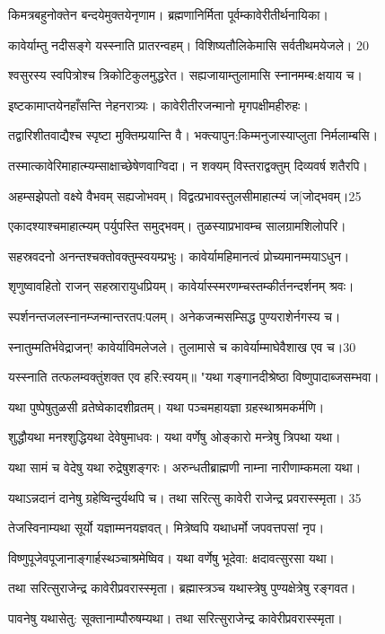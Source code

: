 किमत्रबहुनोक्तेन बन्दयेमुक्तयेनृणाम।
ब्रह्मणानिर्मिता पूर्वम्कावेरीतीर्थनायिका।

कावेर्याम्तु नदीसङ्गे यस्स्नाति प्रातरन्वहम्।
विशिष्यतौलिकेमासि सर्वतीथमयेजले। 20

श्वसुरस्य स्वपित्रोश्च त्रिकोटिकुलमुद्धरेत।
सह्यजायाम्तुलामासि स्नानमम्ब:क्षयाय च।

इष्टकामाप्तयेनहाँसन्ति नेहनरात्र्यः।
कावेरीतीरजन्मानो मृगपक्षीमहीरुहः।

तद्वारिशीतवाद्यैश्च स्पृष्टा मुक्तिम्प्रयान्ति वै।
भक्त्यापुन:किम्मनुजास्याप्लुता निर्मलाम्बसि।

तस्मात्कावेरिमाहात्म्यम्साक्षाच्छेषेणवाग्विदा।
न शक्यम् विस्तराद्वक्तुम् दिव्यवर्ष शतैरपि।

अहम्सझेपतो वक्ष्ये वैभवम् सह्यजोभवम्।
विद्वत्प्रभावस्तुलसीमाहात्म्यं ज[जोद्भवम्।25

एकादश्याश्चमाहात्म्यम् पर्युपस्ति समुद्भवम्।
तुळस्याप्रभावम्च सालग्रामशिलोपरि।

सहस्रवदनो अनन्तश्चक्तोवक्तुम्स्वयम्प्रभुः।
कावेर्यामहिमानत्वं प्रोच्यमानम्मयाऽधुन।

शृणुष्वावहितो राजन् सहस्रारायुधप्रियम्।
कावेर्यास्स्मरणम्चस्तम्कीर्तनन्दर्शनम् श्रवः।

स्पर्शनन्तजलस्नानम्जन्मान्तरतप:पलम्।
अनेकजन्मसम्सिद्ध पुण्यराशेर्नगस्य च।

स्नातुम्मतिर्भवेद्राजन्! कावेर्याविमलेजले।
तुलामासे च कावेर्याम्माघेवैशाख एव च।30

यस्स्नाति तत्फलम्वक्तुंशक्त एव हरि:स्वयम्॥
"यथा गङ्गानदीश्रेष्ठा विष्णुपादाब्जसम्भवा।

यथा पुष्पेषुतुळसी व्रतेष्वेकादशीव्रतम्।
यथा पञ्चमहायज्ञा ग्रहस्थाश्रमकर्मणि।

शुद्धौयथा मनश्शुद्धियथा देवेषुमाधवः।
यथा वर्णेषु ओङ्कारो मन्त्रेषु त्रिपथा यथा।

यथा सामं च वेदेषु यथा रुद्रेषुशङ्गरः।
अरुन्धतीब्राह्मणी नाम्ना नारीणाम्कमला यथा।

यथाऽन्नदानं दानेषु ग्रहेष्विन्दुर्यथपि च।
तथा सरित्सु कावेरी राजेन्द्र प्रवरास्स्मृता। 35

तेजस्विनाम्यथा सूर्यो यज्ञाम्मनयज्ञवत्।
मित्रेष्वपि यथाधर्मो जपवत्तपसां नृप।

विष्णुपूजेवपूजानाङ्गार्हस्थञ्चाश्रमेष्विव।
यथा वर्णेषु भूदेवा: क्षदावत्सुरसा यथा।

तथा सरित्सुराजेन्द्र कावेरीप्रवरास्स्मृता।
ब्रह्मास्त्रञ्च यथास्त्रेषु पुण्यक्षेत्रेषु रङ्गवत।

पावनेषु यथासेतु: सूक्तानाम्पौरुषम्यथा।
तथा सरित्सुराजेन्द्र कावेरीप्रवरास्स्मृता।

